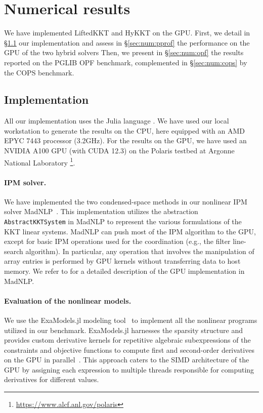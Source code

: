 \section{Numerical results}
We have implemented LiftedKKT and HyKKT on the GPU.
First, we detail in \S\ref{sec:num:implementation}
our implementation and assess in \S\ref{sec:num:pprof} the performance on the GPU of the two hybrid solvers
Then, we present in \S\ref{sec:num:opf} the results reported on the PGLIB OPF benchmark, complemented in \S\ref{sec:num:cops} by the COPS benchmark.

\subsection{Implementation}
\label{sec:num:implementation}
All our implementation uses the Julia language \cite{bezanson-edelman-karpinski-shah-2017}.
We have used our local workstation to generate the results on the CPU, here equipped
with an AMD EPYC 7443 processor (3.2GHz).
For the results on the GPU, we have used an NVIDIA A100 GPU (with CUDA 12.3) on
the Polaris testbed at Argonne National Laboratory
\footnote{\url{https://www.alcf.anl.gov/polaris}}.

\paragraph{IPM solver.}
We have implemented the two condensed-space methods in our nonlinear IPM solver MadNLP~\cite{shin2021graph}.
This implementation utilizes the abstraction {\tt AbstractKKTSystem}
in MadNLP to represent the various formulations of the KKT linear systems.
MadNLP can push most of the IPM algorithm to the GPU, except for basic IPM operations used for the coordination (e.g., the filter line-search algorithm).
In particular, any operation that involves the manipulation of array entries is performed by GPU kernels without transferring data to host memory.
We refer to \cite{shin2023accelerating} for a detailed description of the GPU implementation in MadNLP.

\paragraph{Evaluation of the nonlinear models.}
We use the ExaModels.jl modeling tool~\cite{shin2023accelerating} to implement all the nonlinear programs utilized in our benchmark.
ExaModels.jl harnesses the sparsity structure and provides custom derivative kernels for repetitive algebraic subexpressions of the constraints and objective functions to compute first and second-order derivatives on the GPU in parallel~\cite{bischof1991exploiting,enzyme2021}.
This approach caters to the SIMD architecture of the GPU by assigning each expression to multiple threads responsible for computing derivatives for different values.

